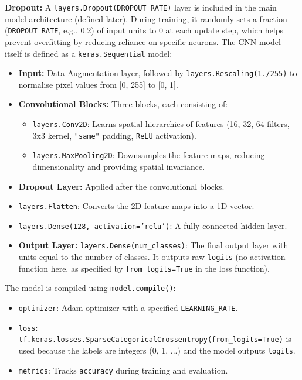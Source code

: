\textbf{Dropout:} A \verb|layers.Dropout(DROPOUT_RATE)| layer is included in the main model architecture (defined later). During training, it randomly sets a fraction (\verb|DROPOUT_RATE|, e.g., 0.2) of input units to 0 at each update step, which helps prevent overfitting by reducing reliance on specific neurons. The CNN model itself is defined as a \verb|keras.Sequential| model:
\begin{itemize}
    \item \textbf{Input:} Data Augmentation layer, followed by \verb|layers.Rescaling(1./255)| to normalise pixel values from [0, 255] to [0, 1].
    \item \textbf{Convolutional Blocks:} Three blocks, each consisting of:
    \begin{itemize}
        \item \verb|layers.Conv2D|: Learns spatial hierarchies of features (16, 32, 64 filters, 3x3 kernel, \verb|"same"| padding, \verb|ReLU| activation).
        \item \verb|layers.MaxPooling2D|: Downsamples the feature maps, reducing dimensionality and providing spatial invariance.
    \end{itemize}
    \item \textbf{Dropout Layer:} Applied after the convolutional blocks.
    \item \texttt{layers.Flatten}: Converts the 2D feature maps into a 1D vector.
    \item \texttt{layers.Dense(128, activation='relu')}: A fully connected hidden layer.
    \item \textbf{Output Layer:} \verb|layers.Dense(num_classes)|: The final output layer with units equal to the number of classes. It outputs raw \verb|logits| (no activation function here, as specified by \verb|from_logits=True| in the loss function).
\end{itemize}
The model is compiled using \verb|model.compile()|:
\begin{itemize}
    \item \texttt{optimizer}: Adam optimizer with a specified \verb|LEARNING_RATE|.
    \item \texttt{loss}: \verb|tf.keras.losses.SparseCategoricalCrossentropy(from_logits=True)| is used because the labels are integers (0, 1, ...) and the model outputs \verb|logits|.
    \item \verb|metrics|: Tracks \verb|accuracy| during training and evaluation.
\end{itemize}

